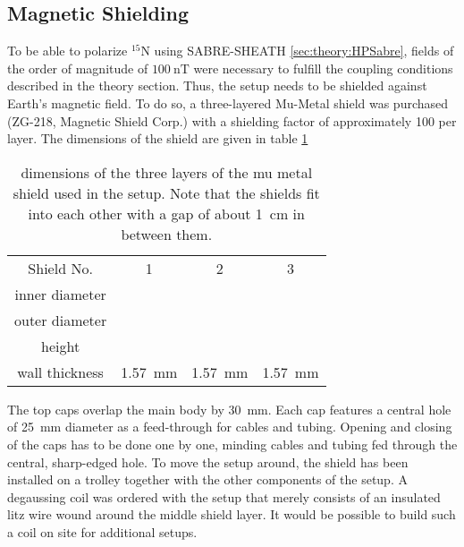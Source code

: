         \subsection{Magnetic Shielding}
        To be able to polarize $^{15}\mathrm{N}$ using SABRE-SHEATH \ref{sec:theory:HPSabre}, fields of the order of magnitude of $\SI{100}{\nano\tesla}$ were necessary to fulfill the coupling conditions described in the theory section. Thus, the setup needs to be shielded against Earth's magnetic field. To do so, a three-layered Mu-Metal shield was purchased (ZG-218, Magnetic Shield Corp.) with a shielding factor of approximately 100 per layer. The dimensions of the shield are given in table \ref{table:matMeth:muMetalDims}
            \begin{table}
                \centering
                \begin{tabular}{cccc}
                    Shield No. & 1 & 2 & 3 \\
                    inner diameter & & & \\
                    outer diameter & & & \\
                    height & & &\\
                    wall thickness &\SI{1.57}{\mm}&\SI{1.57}{\mm}&\SI{1.57}{\mm} 
                \end{tabular}
                \caption[Shield dimensions]{dimensions of the three layers of the mu metal shield used in the setup. Note that the shields  fit into each other with a gap of about \SI{1}{\cm} in between them.}
                \label{table:matMeth:muMetalDims}
            \end{table}
            The top caps overlap the main body by \SI{30}{\mm}.  Each cap features a central hole of \SI{25}{\mm} diameter as a feed-through for cables and tubing. Opening and closing of the caps has to be done one by one, minding cables and tubing fed through the central, sharp-edged hole. To move the setup around, the shield has been installed on a trolley together with the other components of the setup.  A degaussing coil was ordered with the setup that merely consists of an insulated litz wire wound around the middle shield layer.  It would be possible to build such a coil on site for additional setups.
